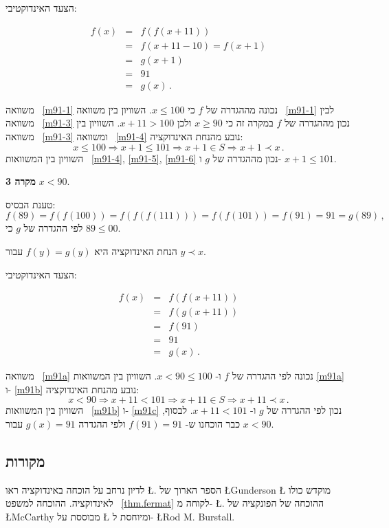 \noindent{}%
הצעד האינדוקטיבי:

\begin{eqnarray}
f(x) &=& f(f(x+11))\label{m91-1}\\
&=& f(x+11-10)= f(x+1)\label{m91-3}\\
&=& g(x+1)\label{m91-4}\\
&=& 91\label{m91-5}\\
&=& g(x)\label{m91-6}\,.
\end{eqnarray}

משוואה%
~\ref{m91-1}
נכונה מההגדרה של
$f$
כי
$x\leq 100$.
השוויון בין משוואה%
~\ref{m91-1}
לבין משוואה%
~\ref{m91-3}
נכון מההגדרה של
$f$
במקרה זה כי
$x \geq 90$
ולכן
$x+11 > 100$.
השוויון בין משוואה%
~\ref{m91-3}
ומשוואה%
~\ref{m91-4}
נובע מהנחת האינדוקציה:
\[
x\leq 100 \Rightarrow x+1 \leq 101 \Rightarrow x+1\in S \Rightarrow x+1\prec x\,.
\]
השוויון בין המשוואות%
~\ref{m91-4}, \ref{m91-5}, \ref{m91-6}
נכון מההגדרה של 
$g$
ו-%
$x+1 \leq 101$.

\noindent\textbf{מקרה 3} $x< 90$.

\noindent{}%
טענת הבסיס:
\[
f(89) = f(f(100)) = f(f(f(111))) = f(f(101)) = f(91) = 91 = g(89)\,,
\]
לפי ההגדרה של
$g$
כי
$89\leq 00$.

הנחת האינדוקציה היא
$f(y) = g(y)$
עבור
$y\prec x$.

הצעד האינדוקטיבי:

\begin{eqnarray}
f(x) &=& f(f(x+11))\label{m91a}\\
&=& f(g(x+11))\label{m91b}\\
&=& f(91)\label{m91c}\\
&=& 91\label{m91d}\\
&=& g(x)\,.
\end{eqnarray}



משוואה%
~\ref{m91a}
נכונה לפי ההגדרה של
$f$
ו-%
$x<90\leq 100$.
השוויון בין המשוואות
\ref{m91a}
ו-%
\ref{m91b}
נובע מהנחת האינדוקציה:
\[
x < 90 \Rightarrow x+11< 101 \Rightarrow x+11\in S \Rightarrow x+11 \prec x\,.
\]
השוויון בין המשוואות%
~\ref{m91b}
ו-%
\ref{m91c}
נכון לפי ההגדרה של
$g$
ו-%
$x+11 < 101$.
לבסוף, כבר הוכחנו ש-%
$f(91)=91$
ולפי ההגדרה
$g(x)=91$
עבור
$x<90$.

\subsection*{מקורות}

לדיון נרחב על הוכחה באינדוקציה ראו
\L{\cite{ben-ari:induction}}.
הספר הארוך של
\L{Gunderson}
\L{\cite{gunderson}}
מוקדש כולו לאינדוקציה.
ההוכחה למשפט~%
\ref{thm.fermat}
לקוחה מ-%
\L{\cite{thebook}}.
ההוכחה של הפונקציה של 
\L{McCarthy}
מבוססת על
\L{\cite{manna}}
ומיוחסת ל-%
\L{Rod M. Burstall}.
